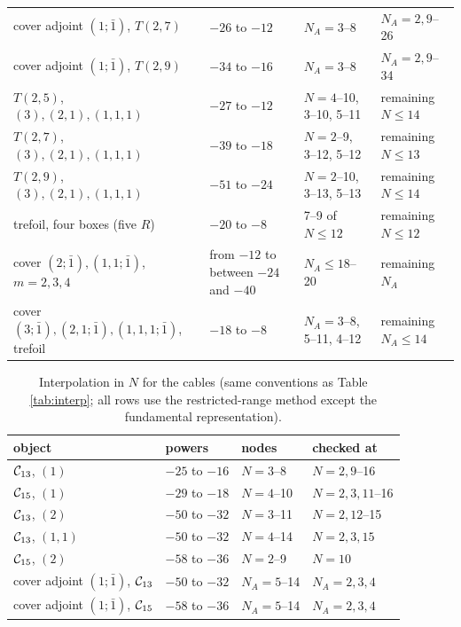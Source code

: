 \begin{table}[htbp]
{\begin{tabular}{llll}
cover adjoint $(1;\bar1)$, $T(2,7)$ & $-26$ to $-12$ & $N_A = 3$--8 & $N_A = 2, 9$--26 \\
cover adjoint $(1;\bar1)$, $T(2,9)$ & $-34$ to $-16$ & $N_A = 3$--8 & $N_A = 2, 9$--34 \\
$T(2,5)$, $(3), (2,1), (1,1,1)$ & $-27$ to $-12$ & $N = 4$--10, 3--10, 5--11 & remaining $N \le 14$ \\
$T(2,7)$, $(3), (2,1), (1,1,1)$ & $-39$ to $-18$ & $N = 2$--9, 3--12, 5--12 & remaining $N \le 13$ \\
$T(2,9)$, $(3), (2,1), (1,1,1)$ & $-51$ to $-24$ & $N = 2$--10, 3--13, 5--13 & remaining $N \le 14$ \\
trefoil, four boxes (five $R$) & $-20$ to $-8$ & 7--9 of $N \le 12$ & remaining $N \le 12$ \\
cover $(2;\bar1), (1,1;\bar1)$, $m = 2, 3, 4$ & from $-12$ to between $-24$ and $-40$ & $N_A \le 18$--20 & remaining $N_A$ \\
cover $(3;\bar1), (2,1;\bar1), (1,1,1;\bar1)$, trefoil & $-18$ to $-8$ & $N_A = 3$--8, 5--11, 4--12 & remaining $N_A \le 14$ \\
\bottomrule
\end{tabular}}
\end{table}
\begin{table}[htbp]
\centering
\caption{Interpolation in $N$ for the cables (same conventions as Table \ref{tab:interp}; all rows use the restricted-range method except the fundamental representation).}\label{tab:cableinterp}
\footnotesize
\begin{tabular}{llll}
\toprule
object & powers & nodes & checked at \\
\midrule
$\mathcal{C}_{13}$, $(1)$ & $-25$ to $-16$ & $N = 3$--8 & $N = 2, 9$--16 \\
$\mathcal{C}_{15}$, $(1)$ & $-29$ to $-18$ & $N = 4$--10 & $N = 2, 3, 11$--16 \\
$\mathcal{C}_{13}$, $(2)$ & $-50$ to $-32$ & $N = 3$--11 & $N = 2, 12$--15 \\
$\mathcal{C}_{13}$, $(1,1)$ & $-50$ to $-32$ & $N = 4$--14 & $N = 2, 3, 15$ \\
$\mathcal{C}_{15}$, $(2)$ & $-58$ to $-36$ & $N = 2$--9 & $N = 10$ \\
cover adjoint $(1;\bar1)$, $\mathcal{C}_{13}$ & $-50$ to $-32$ & $N_A = 5$--14 & $N_A = 2, 3, 4$ \\
cover adjoint $(1;\bar1)$, $\mathcal{C}_{15}$ & $-58$ to $-36$ & $N_A = 5$--14 & $N_A = 2, 3, 4$ \\
\bottomrule
\end{tabular}
\end{table}


